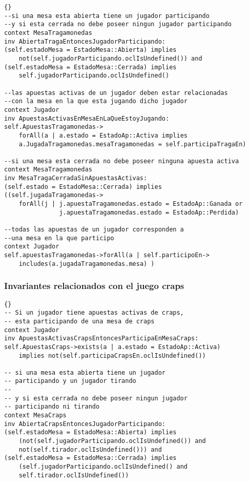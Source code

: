 \begin{framed}
\begin{lstlisting}[frame=trbl]{}
--si una mesa esta abierta tiene un jugador participando 
--y si esta cerrada no debe poseer ningun jugador participando
context MesaTragamonedas
inv AbiertaTragaEntoncesJugadorParticipando:
(self.estadoMesa = EstadoMesa::Abierta) implies 
    not(self.jugadorParticipando.oclIsUndefined()) and
(self.estadoMesa = EstadoMesa::Cerrada) implies 
    self.jugadorParticipando.oclIsUndefined()

--las apuestas activas de un jugador deben estar relacionadas 
--con la mesa en la que esta jugando dicho jugador
context Jugador
inv ApuestasActivasEnMesaEnLaQueEstoyJugando:
self.ApuestasTragamonedas->
    forAll(a | a.estado = EstadoAp::Activa implies 
    a.JugadaTragamonedas.mesaTragamonedas = self.participaTragaEn)

--si una mesa esta cerrada no debe poseer ninguna apuesta activa
context MesaTragamonedas
inv MesaTragaCerradaSinApuestasActivas:
(self.estado = EstadoMesa::Cerrada) implies 
((self.jugadaTragamonedas->
    forAll(j | j.apuestaTragamonedas.estado = EstadoAp::Ganada or 
               j.apuestaTragamonedas.estado = EstadoAp::Perdida)

--todas las apuestas de un jugador corresponden a 
--una mesa en la que participo
context Jugador
self.apuestasTragamonedas->forAll(a | self.participoEn->
    includes(a.jugadaTragamonedas.mesa) )
\end{lstlisting}

\subsubsection{Invariantes relacionados con el juego craps}

\lstset{language=ocl}
\lstset{commentstyle=\textit}
\begin{lstlisting}[frame=trbl]{}
-- Si un jugador tiene apuestas activas de craps,
-- esta participando de una mesa de craps
context Jugador
inv ApuestasActivasCrapsEntoncesParticipaEnMesaCraps:
self.ApuestasCraps->exists(a | a.estado = EstadoAp::Activa)
    implies not(self.participaCrapsEn.oclIsUndefined())
    
-- si una mesa esta abierta tiene un jugador 
-- participando y un jugador tirando
--
-- y si esta cerrada no debe poseer ningun jugador 
-- participando ni tirando
context MesaCraps
inv AbiertaCrapsEntoncesJugadorParticipando:
(self.estadoMesa = EstadoMesa::Abierta) implies 
    (not(self.jugadorParticipando.oclIsUndefined()) and
    not(self.tirador.oclIsUndefined())) and
(self.estadoMesa = EstadoMesa::Cerrada) implies 
    (self.jugadorParticipando.oclIsUndefined() and
    self.tirador.oclIsUndefined())
    

\end{lstlisting}
\end{framed}
